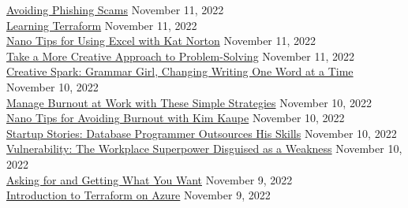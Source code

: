 \documentclass[10pt]{res} %
\begin{document}
\begin{resume}
\href{https://www.linkedin.com/learning/certificates/f0bbf931531f93add0dacda9878b227ccb3292333e4027bc169861ef2f9a6a25}{\color{blue}Avoiding Phishing Scams} \hfill November 11, 2022 \\
\href{https://www.linkedin.com/learning/certificates/b65c71452ec2991038e4f7ce23469be3841f3a9e9fa575312252505f81cd931f}{\color{blue}Learning Terraform} \hfill November 11, 2022 \\
\href{https://www.linkedin.com/learning/certificates/f0a4f0eecd33eb6566f9044bab983aeb4e8ba3ab2f073643c96ae2ef867be7b4}{\color{blue}Nano Tips for Using Excel with Kat Norton} \hfill November 11, 2022 \\
\href{https://www.linkedin.com/learning/certificates/d2d34292a668e1a4b0591cbdec93c917e38ee2e0370d0d4709693513525bf6bc}{\color{blue}Take a More Creative Approach to Problem-Solving} \hfill November 11, 2022 \\
\href{https://www.linkedin.com/learning/certificates/ebd3109aeaa4083b1c0cc7e4e42c7a7d62b5ae320a4f44c8b9029019924d6942}{\color{blue}Creative Spark: Grammar Girl, Changing Writing One Word at a Time} \hfill November 10, 2022 \\
\href{https://www.linkedin.com/learning/certificates/54af638e3b93a4ba284ba8a38baaee714ee7022ef8f6c9a6fc9b085a57ae58f2}{\color{blue}Manage Burnout at Work with These Simple Strategies} \hfill November 10, 2022 \\
\href{https://www.linkedin.com/learning/certificates/804c24aa055449cd3bab269ab3fd0b420c8cb2d278591ad6d6a02fa7ec26e056}{\color{blue}Nano Tips for Avoiding Burnout with Kim Kaupe} \hfill November 10, 2022 \\
\href{https://www.linkedin.com/learning/certificates/32d9dd5b7444e6b2ad38bb48529ffe0adf90dac9c54d43214c815cef1a350886}{\color{blue}Startup Stories: Database Programmer Outsources His Skills} \hfill November 10, 2022 \\
\href{https://www.linkedin.com/learning/certificates/c70f04968f933443a67e373be54d8bbafa81ecc816dfcfa73c4a3e4bc6cb98f6}{\color{blue}Vulnerability: The Workplace Superpower Disguised as a Weakness} \hfill November 10, 2022 \\
\href{https://www.linkedin.com/learning/certificates/ad0851c53e4afdd2527b80770af0fd85cfc77638a9008a1e278d2f89beb693a4}{\color{blue}Asking for and Getting What You Want} \hfill November 9, 2022 \\
\href{https://www.linkedin.com/learning/certificates/294a900bd67bcc4958c6e63c0a07d3b336105418f461e80acf1340ec00931f9d}{\color{blue}Introduction to Terraform on Azure} \hfill November 9, 2022 \\

\end{resume}
\end{document}
